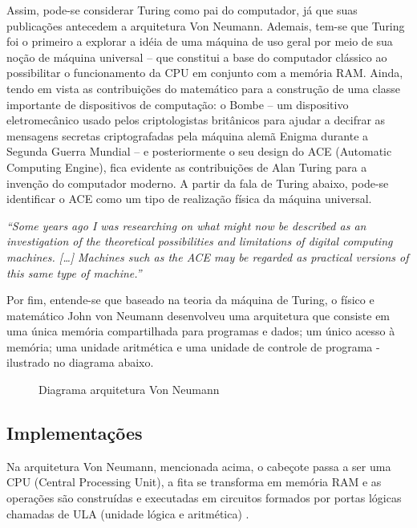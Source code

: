 Assim, pode-se considerar Turing como pai do computador, já que suas publicações antecedem a arquitetura Von Neumann. Ademais, tem-se que Turing foi o primeiro a explorar a idéia de uma máquina de uso geral por meio de sua noção de máquina universal – que constitui a base do computador clássico ao possibilitar o funcionamento da CPU em conjunto com a memória RAM. Ainda, tendo em vista as contribuições do matemático para a construção de uma classe importante de dispositivos de computação: o Bombe – um dispositivo eletromecânico usado pelos criptologistas britânicos para ajudar a decifrar as mensagens secretas criptografadas pela máquina alemã Enigma durante a Segunda Guerra Mundial – e posteriormente o seu design do ACE (Automatic Computing Engine), fica evidente as contribuições de Alan Turing para a invenção do computador moderno. A partir da fala de Turing abaixo, pode-se identificar o ACE como um tipo de realização física da máquina universal.

\textit{
  ``Some years ago I was researching on what might now be described as an investigation of the theoretical possibilities and limitations of digital computing machines. […] Machines such as the ACE may be regarded as practical versions of this same type of machine.'' \cite{11}
}

Por fim, entende-se que baseado na teoria da máquina de Turing, o físico e matemático John von Neumann desenvolveu uma arquitetura que consiste em uma única memória compartilhada para programas e dados; um único acesso à memória; uma unidade aritmética e uma unidade de controle de programa - ilustrado no diagrama abaixo.

\vspace{1cm}
\begin{figure}[H] \centering 
  \caption{\label{von_neumann_architecture} Diagrama arquitetura Von Neumann} 
\end{figure}

\subsection{Implementações}

Na arquitetura Von Neumann, mencionada acima, o cabeçote passa a ser uma CPU (Central Processing Unit), a fita se transforma em memória RAM e as operações são construídas e executadas em circuitos formados por portas lógicas chamadas de ULA (unidade lógica e aritmética) \cite{12}.

